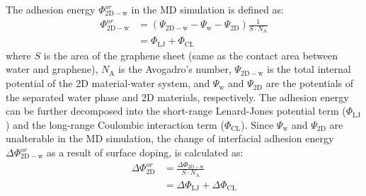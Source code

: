 \documentclass[journal=ancac3,manuscript=article,email=true]{achemso}
\begin{document}
The adhesion energy \(\Phi_{\mathrm{2D-w}}^{or}\) in the MD simulation is
defined as:
\begin{equation}
\label{eqn:Delta-Phi-or-definition}
\begin{aligned}
\Phi_{\mathrm{2D-w}}^{or} &= (\Psi_{\mathrm{2D-w}} - \Psi_{\mathrm{w}} - \Psi_{\mathrm{2D}})\frac{1}{S \cdot N_{\mathrm{A}}} \\
                     &= \Phi_{\mathrm{LJ}} + \Phi_{\mathrm{CL}}
\end{aligned}
\end{equation}
where \(S\) is the area of the graphene sheet (same as the contact area
 between water and graphene), \(N_{\mathrm{A}}\) is the Avogadro's
 number, \(\Psi_{\mathrm{2D-w}}\) is the total internal potential of the
 2D material-water system, and \(\Psi_{\mathrm{w}}\) and
 \(\Psi_{\mathrm{2D}}\) are the potentials of the separated water phase
 and 2D materials, respectively.  The adhesion energy can be further
 decomposed into the short-range Lenard-Jones potential term
 (\(\Phi_{\mathrm{LJ}}\)) and the long-range Coulombic interaction term
 (\(\Phi_{\mathrm{CL}}\)). Since \(\Psi_{\mathrm{w}}\) and
 \(\Psi_{\mathrm{2D}}\) are unalterable in the MD simulation, the change
 of interfacial adhesion energy \(\Delta \Phi_{\mathrm{2D-w}}^{or}\) as a
 result of surface doping, is calculated as:
\begin{equation}
\label{eqn:delta-Phi-2D-or}
\begin{aligned}
\Delta \Phi_{\mathrm{2D}}^{or} &= \frac{\Delta \Phi_{\mathrm{2D-w}}}{S \cdot N_{\mathrm{A}}} \\
                               &= \Delta \Phi_{\mathrm{LJ}} + \Delta \Phi_{\mathrm{CL}}
\end{aligned}
\end{equation}
\end{document}
